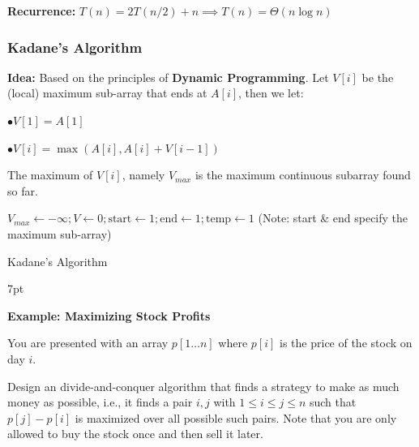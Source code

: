 \documentclass[10pt]{article}
\newenvironment{formal}[2]{%
	\def\FrameCommand{%
		\hspace{1pt}%
		{\color{#1}\vrule width 2pt}%
		{\color{#2}\vrule width 4pt}%
		\colorbox{#2}%
	}%
	\MakeFramed{\advance\hsize-\width\FrameRestore}%
	\noindent\hspace{-4.55pt}%
	\begin{adjustwidth}{}{7pt}%
		\vspace{2pt}\vspace{2pt}%
	}
	{%
		\vspace{2pt}\end{adjustwidth}\endMakeFramed%
}
\begin{document}
\textbf{Recurrence:} $T(n) = 2T(n/2)+n \implies T(n) = \Theta(n\log n)$

\subsubsection{Kadane's Algorithm}

\textbf{Idea:} Based on the principles of \textbf{Dynamic Programming}. Let $V[i]$ be the (local) maximum sub-array that ends at $A[i]$, then we let:

$\bullet V[1] = A[1]$

$\bullet V[i] = \max(A[i], A[i] + V[i-1])$

The maximum of $V[i]$, namely $V_{max}$ is the maximum continuous subarray found so far.

\begin{algorithm}
	\SetAlgoLined
	
	$V_{max} \gets -\infty; V \gets 0; \text{start} \gets 1; \text{end} \gets 1; \text{temp} \gets 1$ (Note: start \& end specify the maximum sub-array)
		
	
	\caption{Kadane's Algorithm}
\end{algorithm}

\begin{formal}{Brown}{brownshade}
	
	\textbf{Example: Maximizing Stock Profits}
	
	You are presented with an array $p[1\dots n]$ where $p[i]$ is the price of the stock on day $i$.
	
	Design an divide-and-conquer algorithm that finds a strategy to make as much money as possible, i.e., it finds a pair $i, j$ with $1\leq i\leq j\leq n$ such that $p[j]-p[i]$ is maximized over all possible such pairs. Note that you are only allowed to buy the stock once and then sell it later.

\end{formal}
\end{document}
